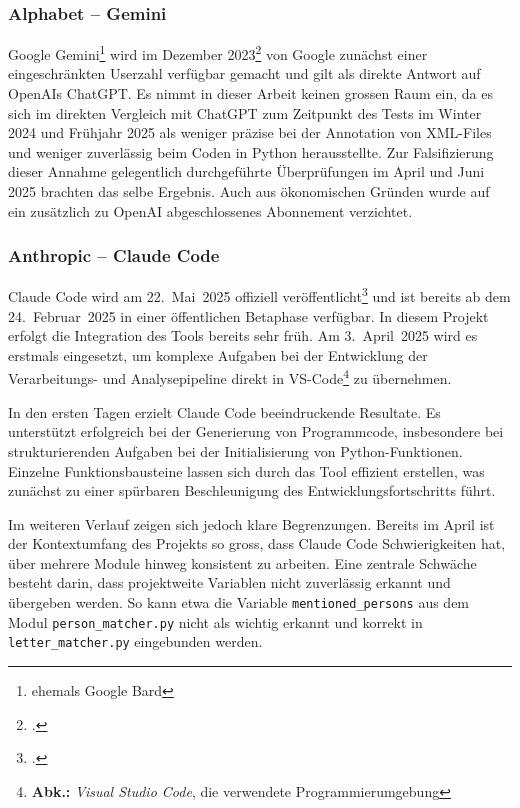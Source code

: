 \documentclass[12pt, a4paper, ngerman, bidi=default]{article}
\let\cite\footcite
\begin{document}
\subsubsection{Alphabet – Gemini}
Google Gemini\footnote{ehemals Google Bard} wird im Dezember 2023\cite{noauthor_gemini_2023} von Google zunächst einer eingeschränkten Userzahl verfügbar gemacht und gilt als direkte Antwort auf OpenAIs ChatGPT. Es nimmt in dieser Arbeit keinen grossen Raum ein, da es sich im direkten Vergleich mit ChatGPT zum Zeitpunkt des Tests im Winter 2024 und Frühjahr 2025 als weniger präzise bei der Annotation von XML-Files und weniger zuverlässig beim Coden in Python herausstellte. Zur Falsifizierung dieser Annahme gelegentlich durchgeführte Überprüfungen im April und Juni 2025 brachten das selbe Ergebnis. Auch aus ökonomischen Gründen wurde auf ein zusätzlich zu OpenAI abgeschlossenes Abonnement verzichtet.

\subsubsection{Anthropic – Claude Code}\label{subsec:claude_code}

Claude Code wird am 22.~Mai~2025 offiziell veröffentlicht\cite{noauthor_claude_nodate} und ist bereits ab dem 24.~Februar~2025 in einer öffentlichen Betaphase verfügbar. In diesem Projekt erfolgt die Integration des Tools bereits sehr früh. Am 3.~April~2025 wird es erstmals eingesetzt, um komplexe Aufgaben bei der Entwicklung der Verarbeitungs- und Analysepipeline direkt in VS-Code\footnote{\textbf{Abk.:} \textit{Visual Studio Code}, die verwendete Programmierumgebung} zu übernehmen.

In den ersten Tagen erzielt Claude Code beeindruckende Resultate. Es unterstützt erfolgreich bei der Generierung von Programmcode, insbesondere bei strukturierenden Aufgaben bei der Initialisierung von Python-Funktionen. Einzelne Funktionsbausteine lassen sich durch das Tool effizient erstellen, was zunächst zu einer spürbaren Beschleunigung des Entwicklungsfortschritts führt.

Im weiteren Verlauf zeigen sich jedoch klare Begrenzungen. Bereits im April ist der Kontextumfang des Projekts so gross, dass Claude Code Schwierigkeiten hat, über mehrere Module hinweg konsistent zu arbeiten. Eine zentrale Schwäche besteht darin, dass projektweite Variablen nicht zuverlässig erkannt und übergeben werden. So kann etwa die Variable \texttt{mentioned\_persons} aus dem Modul \texttt{person\_matcher.py} nicht als wichtig erkannt und korrekt in \texttt{letter\_matcher.py} eingebunden werden.
\end{document}
